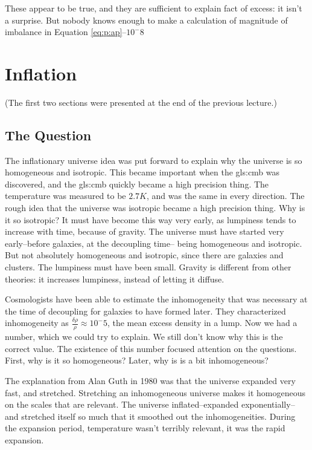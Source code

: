 \documentclass[]{article}
\begin{document}
 These appear to be true, and they are sufficient to explain fact of excess: it isn't a surprise. But nobody knows enough to make a calculation of magnitude of imbalance in Equation \eqref{eq:p:ap}--$10^-8$
 
 
\section{Inflation}

(The first two sections were presented at the end of the previous lecture.)
\subsection{The Question}

The inflationary universe idea was put forward to explain why the universe is so homogeneous and isotropic. This became important when the \glsdesc{gls:cmb} was discovered, and the \gls{gls:cmb} quickly became a high precision thing. The temperature was measured to be $2.7K$, and was the same in every direction. The rough idea that the universe was isotropic became a high precision thing. Why is it so isotropic? It must have become this way very early, as lumpiness tends to increase with time, because of gravity. The universe must have started very early--before galaxies, at the decoupling time-- being homogeneous and isotropic. But not absolutely homogeneous and isotropic, since there are galaxies and clusters. The lumpiness must have been small. Gravity is different from other theories: it increases lumpiness, instead of letting it diffuse.

Cosmologists have been able to estimate the inhomogeneity that was necessary at the time of decoupling for galaxies to have formed later. They characterized inhomogeneity as $\frac{\delta\rho}{\rho}\approx10^-5$, the mean excess density in a lump. Now we had a number, which we could try to explain. We still don't know why this is the correct value. The existence of this number focused attention on the questions. First, why is it so homogeneous? Later, why is is a bit inhomogeneous?

The explanation from Alan Guth in 1980 was that the universe expanded very fast, and stretched. Stretching an inhomogeneous universe makes it homogeneous on the scales that are relevant. The universe inflated--expanded exponentially-- and stretched itself so much that it smoothed out the inhomogeneities.  During the expansion period, temperature wasn't terribly relevant, it was the rapid expansion.
\end{document}
